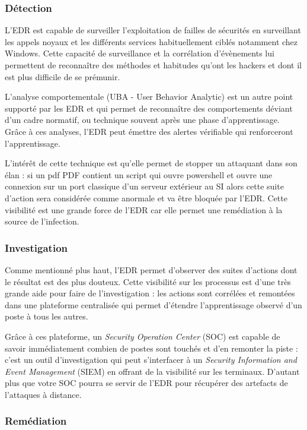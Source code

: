 \subsubsection{Détection}

L’EDR est capable de surveiller l’exploitation de failles de sécurités en surveillant les appels noyaux et les différents services habituellement ciblés notamment chez Windows. Cette capacité de surveillance et la corrélation d’évènements lui permettent de reconnaître des méthodes et habitudes qu’ont les hackers et dont il est plus difficile de se prémunir.

L’analyse comportementale (UBA - User Behavior Analytic) est un autre point supporté par les EDR et qui permet de reconnaître des comportements déviant d’un cadre normatif, ou technique souvent après une phase d’apprentissage. Grâce à ces analyses, l’EDR peut émettre des alertes vérifiable qui renforceront l’apprentissage. 

 L’intérêt de cette technique est qu’elle permet de stopper un attaquant dans son élan : si un pdf PDF contient un script qui ouvre powershell et ouvre une connexion sur un port classique d’un serveur extérieur au SI alors cette suite d’action sera considérée comme anormale et va être bloquée par l’EDR. Cette visibilité est une grande force de l’EDR car elle permet une remédiation à la source de l’infection.


\subsubsection{Investigation}

Comme mentionné plus haut, l’EDR permet d’observer des suites d’actions dont le résultat est des plus douteux. Cette visibilité sur les processus est d’une très grande aide pour faire de l’investigation : les actions sont corrélées et remontées dans une plateforme centralisée qui permet d’étendre l’apprentissage observé d’un poste à tous les autres. 

Grâce à ces plateforme, un \textit{Security Operation Center} (SOC) est capable de savoir immédiatement combien de postes sont touchés et d’en remonter la piste : c’est un outil d’investigation qui peut s'interfacer à  un \textit{Security Information and Event Management} (SIEM) en offrant de la visibilité sur les terminaux. D’autant plus que votre SOC pourra se servir de l’EDR pour récupérer des artefacts de l’attaques à distance.

\subsubsection{Remédiation}

